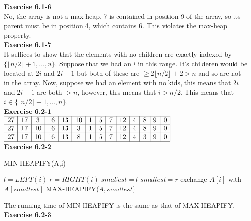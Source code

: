 \documentclass{article}
\begin{document}
\noindent\textbf{Exercise 6.1-6}\\

No, the array is not a max-heap.  7 is contained in position 9 of the array, so its parent must be in position 4, which contains 6.  This violates the max-heap property. \\

\noindent\textbf{Exercise 6.1-7}\\

It suffices to show that the elements with no children are exactly indexed by $\{\lfloor n/2\rfloor+1, \ldots, n\}$. Suppose that we had an $i$ in this range. It's childeren would be located at $2i$ and $2i+1$ but both of these are $\ge 2 \lfloor n/2\rfloor +2 > n$ and so are not in the array. Now, suppose we had an element with no kids, this means that $2i$ and $2i+1$ are both $>n$, however, this means that $i > n/2$. This means that $i\in \{\lfloor n/2\rfloor+1, \ldots, n\}$.\\

\noindent\textbf{Exercise 6.2-1}\\

$
\begin{array}{|c|c|c|c|c|c|c|c|c|c|c|c|c|c|}
\hline
27&17&3&16&13&10&1&5&7&12&4&8&9&0\\
\hline
27&17&10&16&13&3&1&5&7&12&4&8&9&0\\
\hline
27&17&10&16&13&8&1&5&7&12&4&3&9&0\\
\hline
\end{array}
$\\

\noindent\textbf{Exercise 6.2-2}\\

\begin{algorithm}
\caption{MIN-HEAPIFY(A,i)}
\begin{algorithmic}[1]
\State $l=LEFT(i)$ 
\State $r=RIGHT(i)$
	\State $smallest = l$
\EndIf
{}
	\State $smallest = r$
\EndIf
{}
	\State exchange $A[i]$ with $A[smallest]$
	\State MAX-HEAPIFY($A, smallest$)
\EndIf
\end{algorithmic}
\end{algorithm}

The running time of MIN-HEAPIFY is the same as that of MAX-HEAPIFY. \\


\noindent\textbf{Exercise 6.2-3}\\
\end{document}
